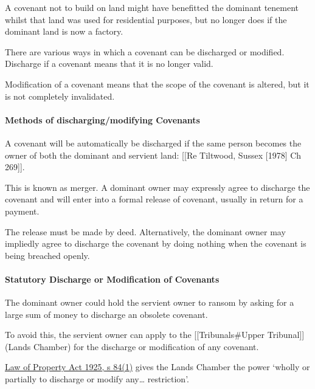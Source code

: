 \documentclass[
]{article}
\newenvironment{Shaded}{}{}
\newcommand{\NormalTok}[1]{#1}
\begin{document}
\begin{Shaded}
\begin{Highlighting}[]
\NormalTok{A covenant not to build on land might have benefitted the dominant tenement whilst that land was used for residential purposes, but no longer does if the dominant land is now a factory.}
\end{Highlighting}
\end{Shaded}

There are various ways in which a covenant can be discharged or
modified. Discharge if a covenant means that it is no longer valid.

Modification of a covenant means that the scope of the covenant is
altered, but it is not completely invalidated.

\hypertarget{methods-of-dischargingmodifying-covenants}{%
\paragraph{Methods of discharging/modifying
Covenants}\label{methods-of-dischargingmodifying-covenants}}

A covenant will be automatically be discharged if the same person
becomes the owner of both the dominant and servient land: {[}{[}Re
Tiltwood, Sussex {[}1978{]} Ch 269{]}{]}.

This is known as merger. A dominant owner may expressly agree to
discharge the covenant and will enter into a formal release of covenant,
usually in return for a payment.

The release must be made by deed. Alternatively, the dominant owner may
impliedly agree to discharge the covenant by doing nothing when the
covenant is being breached openly.

\hypertarget{statutory-discharge-or-modification-of-covenants}{%
\paragraph{Statutory Discharge or Modification of
Covenants}\label{statutory-discharge-or-modification-of-covenants}}

The dominant owner could hold the servient owner to ransom by asking for
a large sum of money to discharge an obsolete covenant.

To avoid this, the servient owner can apply to the
{[}{[}Tribunals\#Upper Tribunal{]}{]} (Lands Chamber) for the discharge
or modification of any covenant.

\href{https://www.legislation.gov.uk/ukpga/Geo5/15-16/20/section/84}{Law
of Property Act 1925, s 84(1)} gives the Lands Chamber the power `wholly
or partially to discharge or modify any\ldots{} restriction'.
\end{document}
